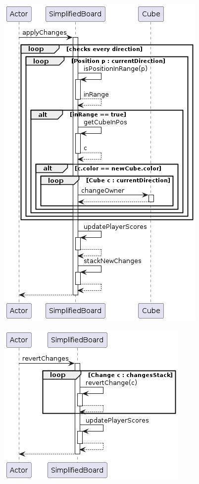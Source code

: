 \documentclass[12pt,a4paper,openright]{book}
\theoremstyle{break}
\begin{document}
\begin{center}
\includegraphics[scale=0.75]{SimplifiedBoard.applyChanges()-sprint7.png} 
\end{center}

\begin{center}
\includegraphics[scale=0.75]{SimplifiedBoard.revertChanges()-sprint7.png} 
\end{center}
\end{document}
